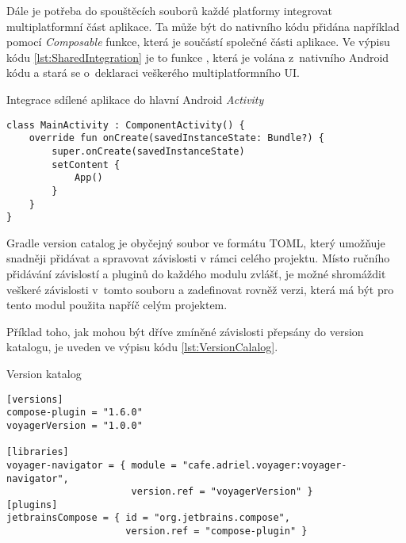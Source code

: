 Dále je potřeba do spouštěcích souborů každé platformy integrovat multiplatformní část aplikace. Ta může být do nativního kódu přidána
například pomocí \textit{Composable} funkce, která je součástí společné části aplikace.
Ve výpisu kódu \ref{lst:SharedIntegration} je to funkce , která je volána z~nativního Android kódu a stará se
o~deklaraci veškerého multiplatformního UI.
\begin{listing}[H]
  \caption{Integrace sdílené aplikace do hlavní Android \textit{Activity}}\label{lst:SharedIntegration}
  \begin{verbatim}
class MainActivity : ComponentActivity() {
    override fun onCreate(savedInstanceState: Bundle?) {
        super.onCreate(savedInstanceState)
        setContent {
            App()
        }
    }
}
\end{verbatim}
\end{listing}






Gradle version catalog je obyčejný soubor ve formátu TOML, který umožňuje snadněji přidávat a spravovat závislosti v rámci celého projektu. 
Místo ručního přidávání závislostí a pluginů do každého modulu zvlášť, je možné shromáždit veškeré závislosti v~tomto souboru a zadefinovat rovněž
verzi, která má být pro tento modul použita napříč celým projektem. \cite{versionCatalog}

Příklad toho, jak mohou být dříve zmíněné závislosti přepsány do version
katalogu, je uveden ve výpisu kódu \ref{lst:VersionCalalog}.

\begin{listing}[H]
\caption{Version katalog}\label{lst:VersionCalalog}
\begin{verbatim}
[versions]
compose-plugin = "1.6.0"
voyagerVersion = "1.0.0"
    
[libraries]
voyager-navigator = { module = "cafe.adriel.voyager:voyager-navigator", 
                      version.ref = "voyagerVersion" }
[plugins]
jetbrainsCompose = { id = "org.jetbrains.compose",
                     version.ref = "compose-plugin" }
\end{verbatim}
\end{listing}



